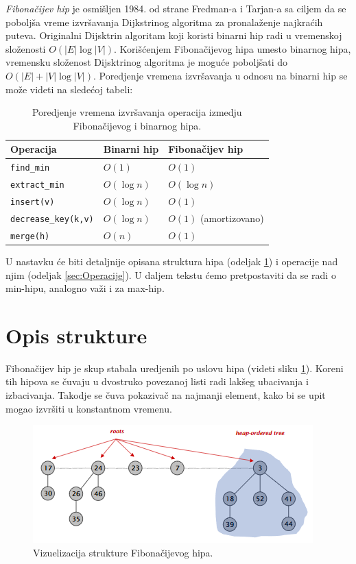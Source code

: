 \documentclass[a4paper]{article}
\theoremstyle{plain}
\theoremstyle{definition}
\begin{document}
\emph{Fibona\v{c}ijev hip} \cite{Book} je osmi\v{s}ljen 1984. od strane Fredman-a i Tarjan-a sa ciljem da se pobolj\v{s}a vreme izvr\v{s}avanja Dijkstrinog algoritma za pronala\v{z}enje najkra\'c{}ih puteva. Originalni Dijsktrin algoritam koji koristi binarni hip radi u vremenskoj slo\v{z}enosti $O(|E|\log{|V|})$. Kori\v{s}\'c{}enjem Fibona\v{c}ijevog hipa umesto binarnog hipa, vremensku slo\v{z}enost Dijsktrinog algoritma je mogu\'c{}e pobolj\v{s}ati do $O(|E| + |V|\log{|V|})$. Poredjenje vremena izvr\v{s}avanja u odnosu na binarni hip se mo\v{z}e videti na slede\'c{}oj tabeli:

\begin{table}[H]
\centering
\begin{tabular}{|l|l|l|}
    \hline
    Operacija                   & Binarni hip  & Fibona\v{c}ijev hip \\
    \hline
    \texttt{find\_min}          & $O(1)$       & $O(1)$              \\
    \texttt{extract\_min}       & $O(\log{n})$ & $O(\log{n})$        \\
    \texttt{insert(v)}          & $O(\log{n})$ & $O(1)$              \\
    \texttt{decrease\_key(k,v)} & $O(\log{n})$ & $O(1)$ (amortizovano) \\
    \texttt{merge(h)}           & $O(n)$       & $O(1)$              \\
    \hline
\end{tabular}
\label{tbl:fig1}
\caption{Poredjenje vremena izvr\v{s}avanja operacija izmedju Fibona\v{c}ijevog i binarnog hipa.}
\end{table}

U nastavku \'{c}e biti detaljnije opisana struktura hipa (odeljak \ref{sec:Struktura}) i operacije nad njim (odeljak \ref{sec:Operacije}). U daljem tekstu \'c{}emo pretpostaviti da se radi o min-hipu, analogno va\v{z}i i za max-hip.


\section{Opis strukture}
\label{sec:Struktura}

Fibona\v{c}ijev hip je skup stabala uredjenih po uslovu hipa (videti sliku \ref{fig1}). Koreni tih hipova se \v{c}uvaju u dvostruko povezanoj listi radi lak\v{s}eg ubacivanja i izbacivanja. Takodje se \v{c}uva pokaziva\v{c} na najmanji element, kako bi se upit mogao izvr\v{s}iti u konstantnom vremenu. 

\begin{figure}[H]
    \centering
    \includegraphics[scale=0.8]{resources/fig1.PNG}
    \caption{Vizuelizacija strukture Fibona\v{c}ijevog hipa.}
    \label{fig1}
\end{figure}
\end{document}
